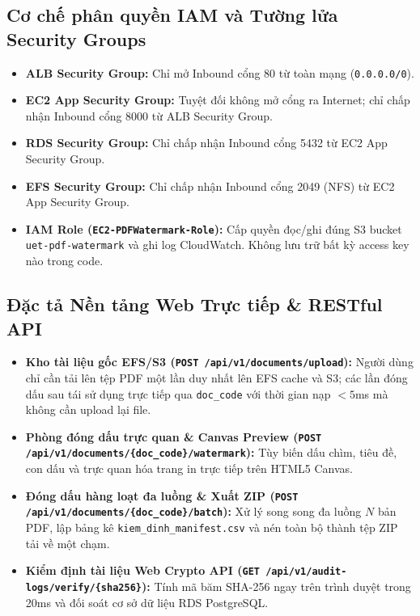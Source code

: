 \documentclass[12pt,a4paper]{report}
\begin{document}
\subsection{Cơ chế phân quyền IAM và Tường lửa Security Groups}
\begin{itemize}
    \item \textbf{ALB Security Group:} Chỉ mở Inbound cổng 80 từ toàn mạng (\texttt{0.0.0.0/0}).
    \item \textbf{EC2 App Security Group:} Tuyệt đối không mở cổng ra Internet; chỉ chấp nhận Inbound cổng 8000 từ ALB Security Group.
    \item \textbf{RDS Security Group:} Chỉ chấp nhận Inbound cổng 5432 từ EC2 App Security Group.
    \item \textbf{EFS Security Group:} Chỉ chấp nhận Inbound cổng 2049 (NFS) từ EC2 App Security Group.
    \item \textbf{IAM Role (\texttt{EC2-PDFWatermark-Role}):} Cấp quyền đọc/ghi đúng S3 bucket \texttt{uet-pdf-watermark} và ghi log CloudWatch. Không lưu trữ bất kỳ access key nào trong code.
\end{itemize}

\subsection{Đặc tả Nền tảng Web Trực tiếp \& RESTful API}
\begin{itemize}
    \item \textbf{Kho tài liệu gốc EFS/S3 (\texttt{POST /api/v1/documents/upload}):} Người dùng chỉ cần tải lên tệp PDF một lần duy nhất lên EFS cache và S3; các lần đóng dấu sau tái sử dụng trực tiếp qua \texttt{doc\_code} với thời gian nạp $<5$ms mà không cần upload lại file.
    \item \textbf{Phòng đóng dấu trực quan \& Canvas Preview (\texttt{POST /api/v1/documents/\{doc\_code\}/watermark}):} Tùy biến dấu chìm, tiêu đề, con dấu và trực quan hóa trang in trực tiếp trên HTML5 Canvas.
    \item \textbf{Đóng dấu hàng loạt đa luồng \& Xuất ZIP (\texttt{POST /api/v1/documents/\{doc\_code\}/batch}):} Xử lý song song đa luồng $N$ bản PDF, lập bảng kê \texttt{kiem\_dinh\_manifest.csv} và nén toàn bộ thành tệp ZIP tải về một chạm.
    \item \textbf{Kiểm định tài liệu Web Crypto API (\texttt{GET /api/v1/audit-logs/verify/\{sha256\}}):} Tính mã băm SHA-256 ngay trên trình duyệt trong 20ms và đối soát cơ sở dữ liệu RDS PostgreSQL.
\end{itemize}
\end{document}

